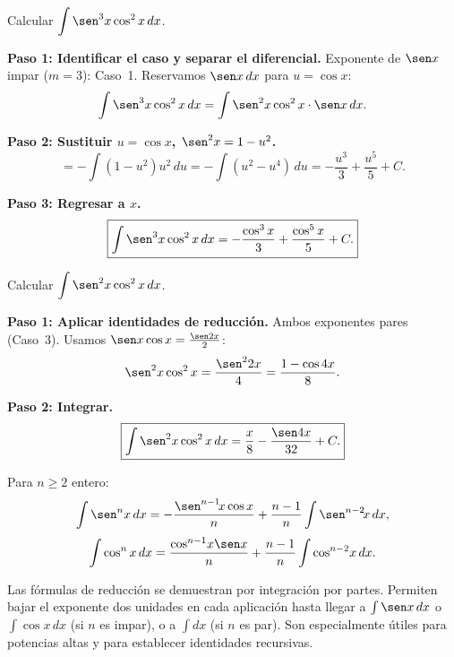 \begin{example}
Calcular $\displaystyle\int \sen^3 x \cos^2 x \, dx$.

\begin{myproof}

\textbf{Paso 1: Identificar el caso y separar el diferencial.}
Exponente de $\sen x$ impar ($m=3$): Caso~1. Reservamos $\sen x\,dx$ para $u=\cos x$:
\[
\int \sen^3 x \cos^2 x \, dx
= \int \sen^2 x \cos^2 x \cdot \sen x \, dx.
\]

\textbf{Paso 2: Sustituir $u = \cos x$, $\sen^2 x = 1-u^2$.}
\[
= -\int (1-u^2)u^2\, du = -\int(u^2 - u^4)\, du
= -\frac{u^3}{3} + \frac{u^5}{5} + C.
\]

\textbf{Paso 3: Regresar a $x$.}
\[
\boxed{\int \sen^3 x \cos^2 x \, dx = -\frac{\cos^3 x}{3} + \frac{\cos^5 x}{5} + C.}
\]
\end{myproof}
\end{example}

\begin{example}
Calcular $\displaystyle\int \sen^2 x \cos^2 x \, dx$.

\begin{myproof}

\textbf{Paso 1: Aplicar identidades de reducción.}
Ambos exponentes pares (Caso~3). Usamos $\sen x\cos x = \frac{\sen 2x}{2}$:
\[
\sen^2 x\cos^2 x = \frac{\sen^2 2x}{4} = \frac{1-\cos 4x}{8}.
\]

\textbf{Paso 2: Integrar.}
\[
\boxed{\int \sen^2 x\cos^2 x\, dx = \frac{x}{8} - \frac{\sen 4x}{32} + C.}
\]
\end{myproof}
\end{example}

\begin{theorem}
Para $n \geq 2$ entero:
\[
\int \sen^n x \, dx
= -\frac{\sen^{n-1}\!x\cos x}{n} + \frac{n-1}{n}\int \sen^{n-2}\!x\, dx,
\]
\[
\int \cos^n x \, dx
= \frac{\cos^{n-1}\!x\sen x}{n} + \frac{n-1}{n}\int \cos^{n-2}\!x\, dx.
\]
\end{theorem}

\begin{rem}
Las fórmulas de reducción se demuestran por integración por partes. Permiten
bajar el exponente dos unidades en cada aplicación hasta llegar a $\int
\sen x\,dx$ o $\int \cos x\,dx$ (si $n$ es impar), o a $\int dx$ (si $n$
es par). Son especialmente útiles para potencias altas y para establecer
identidades recursivas.
\end{rem}

